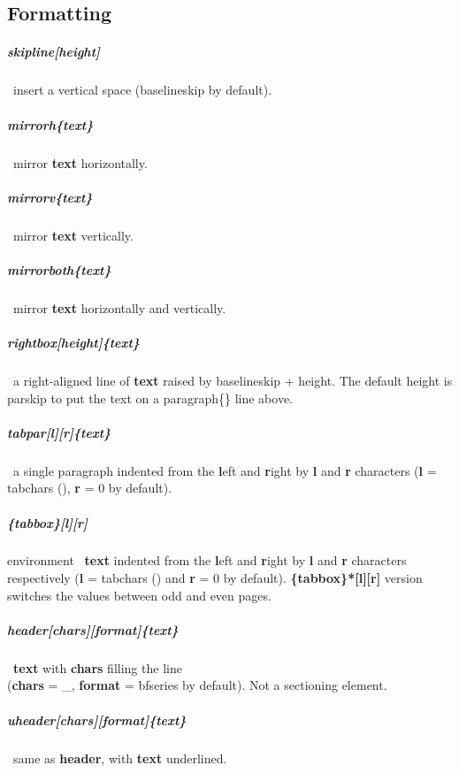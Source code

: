 \documentclass[english,12pt,openany,letterpaper]{book}
\begin{document}
\linefill[\ol{\bs\ /}]
\vspace*{-1ex}
\linefill[\so{\ }\ol{\ul{|}}\so{\ }]
\vspace*{-1ex}
\linefill[\ul{/\ \bs}]

\vfill
\break


\subsection{Formatting}

\subparagraph{\bs skipline[height]} \dash\ insert a vertical space (\bs baselineskip by default).

\skipline

\subparagraph{\bs mirrorh\{text\}} \dash\ mirror \textbf{text} horizontally.

\subparagraph{\bs mirrorv\{text\}} \dash\ mirror \textbf{text} vertically.

\subparagraph{\bs mirrorboth\{text\}} \dash\ mirror \textbf{text} horizontally and vertically.

\skipline

\subparagraph{\bs rightbox[height]\{text\}} \dash\ a right-aligned line of  \textbf{text} raised by \bs baselineskip + height. The default height is \bs parskip to put the text on a \bs paragraph\{\} line above.

\skipline

\subparagraph{\bs tabpar[l][r]\{text\}} \dash\ a single paragraph indented from the \textbf{l}eft and \textbf{r}ight by \textbf{l} and \textbf{r} characters (\textbf{l} = \bs tabchars (\tabchars), \textbf{r} = 0 by default).

\subparagraph{\{tabbox\}[l][r]} environment \dash\ \textbf{text} indented from the \textbf{l}eft and \textbf{r}ight by \textbf{l} and \textbf{r} characters respectively (\textbf{l} = \bs tabchars (\tabchars) and \textbf{r} = 0 by default). \textbf{\{tabbox\}*[l][r]} version switches the values between odd and even pages.

\skipline

\subparagraph{\bs header[chars][format]\{text\}} \dash\ \textbf{text} with \textbf{chars} filling the line
\\(\textbf{chars} = \bs\_, \textbf{format} = \bs bfseries by default). Not a sectioning element.

\subparagraph{\bs uheader[chars][format]\{text\}} \dash\ same as \textbf{\bs header}, with \textbf{text} underlined.

\skipline
\end{document}
